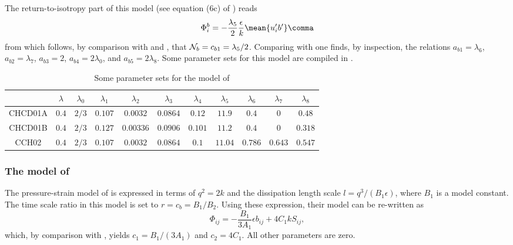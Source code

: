 The return-to-isotropy part of this model (see equation (6c) of
\cite{Chengetal2002}) reads
\begin{equation}
  \label{PhibCHCD2001}
   \Phi^b_i = - \dfrac{\lambda_5}{2} \dfrac{\epsilon}{k} \mean{u'_i b'}
   \comma
\end{equation}
from which follows, by comparison with  and , that 
${\cal N}_b = c_{b1} = \lambda_5/2$. Comparing  with
 one finds, by inspection, the relations $a_{b1} = \lambda_6$, 
$a_{b2} = \lambda_7$, $a_{b3} = 2$, $a_{b4} = 2 \lambda_0$, 
and $a_{b5} = 2 \lambda_8$. Some parameter sets for this model are compiled in .
\begin{table}[!h]
 \begin{tabular}{c|cccccccccc}                                                   
        & $\lambda$    & $\lambda_0$  &  $\lambda_1$  &  $\lambda_2$  & $\lambda_3$  &   
          $\lambda_4$  & $\lambda_5$  &  $\lambda_6$  &  $\lambda_7$  & $\lambda_8$     \\ \hline  
CHCD01A & $0.4$        & $2/3$        &  $0.107$      &  $0.0032$     &  $0.0864$    & 
          $0.12$       & $11.9$       &  $0.4$        &  $0$          & $0.48$          \\ 
CHCD01B & $0.4$        & $2/3$        &  $0.127$      &  $0.00336$    & $0.0906$     & 
          $0.101$      & $11.2$       &  $0.4$        &  $0$          & $0.318$         \\ 
CCH02   & $0.4$        & $2/3$        &  $0.107$      &  $0.0032$     & $0.0864$     & 
          $0.1$        & $11.04$      &  $0.786$      &  $0.643$      & $0.547$         \\ 
 \end{tabular}
 \caption{\label{tab:CHCD}Some parameter sets for the model of \cite{Canutoetal2001a}}
\end{table}





\subsubsection{The model of \cite{MellorYamada82}}
The pressure-strain model of \cite{MellorYamada82} is expressed in
terms of $q^2=2k$ and the dissipation length scale $l=q^3/(B_1
\epsilon)$, where $B_1$ is a model constant.  The time scale ratio 
in this model is set to $r=c_b=B_1/B_2$. Using these expression,
their model can be re-written as
\begin{equation}
  \label{PhiMY82}
   \Phi_{ij} = - \dfrac{B_1}{3 A_1} \epsilon b_{ij} + 4 C_1 k S_{ij}
   \comma
\end{equation}
which, by comparison with , yields $c_1 = B_1 / (3 A_1)$ and
$c_2 = 4 C_1$. All other parameters are zero.

